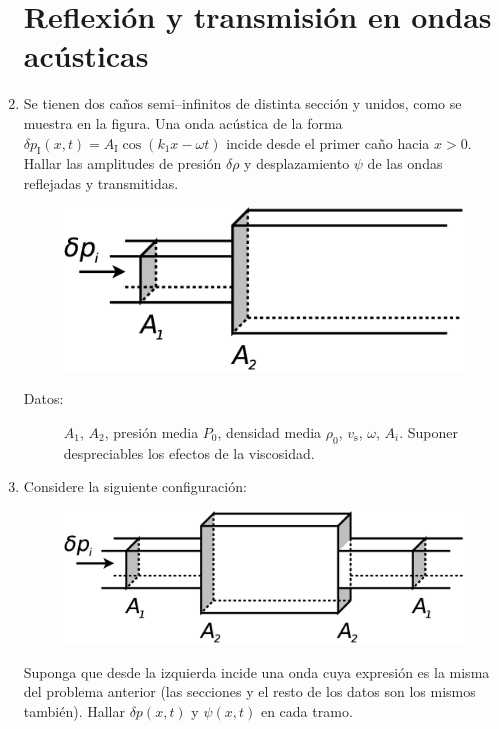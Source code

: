 \documentclass[11pt,spanish]{article}
\begin{document}
\begin{enumerate}
\section*{Reflexión y transmisión en ondas acústicas}


    \item Se tienen dos caños semi--infinitos de distinta sección y unidos, como
    se muestra en la figura. Una onda acústica de la forma
    $\delta p_\text{I}(x,t)=A_\text{I}\cos\left(k_{1}x-\omega t\right)$ incide
    desde el primer caño hacia $x>0$. Hallar las amplitudes de presión
    $\delta \rho$ y desplazamiento $\psi$ de las ondas reflejadas y transmitidas.

    \begin{figure}[H]
        \centering{}\includegraphics[clip,scale=0.25]{figs/ej2-10}
    \end{figure}

    \begin{description}
        \item [{Datos:}] $A_{1}$, $A_{2}$, presión media $P_{0}$, densidad media
        $\rho_{0}$, $v_\text{s}$, $\omega$, $A_{i}$. Suponer despreciables
        los efectos de la viscosidad. 
    \end{description}


    \item Considere la siguiente configuración: 
    \begin{figure}[H]
        \centering{}\includegraphics[clip,scale=0.25]{figs/ej2-11}
    \end{figure}
    Suponga que desde la izquierda incide una onda cuya expresión es la misma
    del problema anterior (las secciones y el resto de los datos son los mismos
    también). Hallar $\delta p(x,t)$ y $\psi(x,t)$ en cada tramo.


\end{enumerate}
\end{document}
